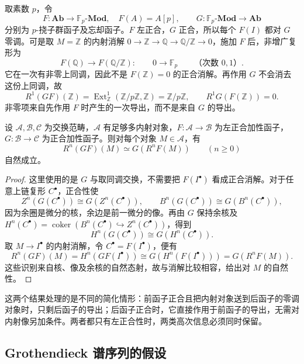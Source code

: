 \begin{example}\label{b4:exm:composite-first-not-exact}
	取素数 \(p\)，令
	\[
		F:\mathbf{Ab}\longrightarrow\mathbb F_p\text{-}\mathbf{Mod},\quad F(A)=A[p], \qquad G:\mathbb F_p\text{-}\mathbf{Mod}\longrightarrow\mathbf{Ab}
	\]
	分别为 \(p\)-挠子群函子及忘却函子。\(F\) 左正合，\(G\) 正合，所以每个 \(F(I)\) 都对 \(G\) 零调。可是取 \(M=\mathbb Z\) 的内射消解 \(0\to\mathbb Z\to\mathbb Q\to\mathbb Q/\mathbb Z\to0\)，施加 \(F\) 后，非增广复形为
	\[
		F(\mathbb Q)\longrightarrow F(\mathbb Q/\mathbb Z): \qquad 0\longrightarrow\mathbb F_p \qquad\text{（次数 }0,1\text{）}.
	\]
	它在一次有非零上同调，因此不是 \(F(\mathbb Z)=0\) 的正合消解。再作用 \(G\) 不会消去这份上同调，故
	\[
		R^1(GF)(\mathbb Z)=\operatorname{Ext}_{\mathbb Z}^1(\mathbb Z/p\mathbb Z,\mathbb Z) =\mathbb Z/p\mathbb Z,\qquad R^1G(F(\mathbb Z))=0.
	\]
	非零项来自先作用 \(F\) 时产生的一次导出，而不是来自 \(G\) 的导出。
\end{example}

\begin{proposition}\label{b4:prop:derived-composite-exact-second}
	设 \(\mathcal A,\mathcal B,\mathcal C\) 为交换范畴，\(\mathcal A\) 有足够多内射对象，\(F:\mathcal A\to\mathcal B\) 为左正合加性函子，\(G:\mathcal B\to\mathcal C\) 为正合加性函子。则对每个对象 \(M\in\mathcal A\)，有
	\[
		R^n(GF)(M)\simeq G(R^nF(M))\qquad(n\ge0)
	\]
	自然成立。
\end{proposition}
\begin{proof}
	这里使用的是 \(G\) 与取同调交换，不需要把 \(F(I^\bullet)\) 看成正合消解。对于任意上链复形 \(C^\bullet\)，正合性使
	\[
		Z^n(G(C^\bullet))\cong G(Z^n(C^\bullet)),\qquad B^n(G(C^\bullet))\cong G(B^n(C^\bullet)),
	\]
	因为余圈是微分的核，余边是前一微分的像。再由 \(G\) 保持余核及 \(H^n(C^\bullet)=\operatorname{coker}(B^n(C^\bullet)\hookrightarrow Z^n(C^\bullet))\)，得到
	\[
		H^n(G(C^\bullet))\cong G(H^n(C^\bullet)).
	\]
	取 \(M\to I^\bullet\) 的内射消解，令 \(C^\bullet=F(I^\bullet)\)，便有
	\[
		R^n(GF)(M)=H^n(GF(I^\bullet)) \cong G(H^n(F(I^\bullet)))=G(R^nF(M)).
	\]
	这些识别来自核、像及余核的自然态射，故与消解比较相容，给出对 \(M\) 的自然性。
\end{proof}

这两个结果处理的是不同的简化情形：前函子正合且把内射对象送到后函子的零调对象时，只剩后函子的导出；后函子正合时，它直接作用于前函子的导出，无需对内射像另加条件。两者都只有左正合性时，两类高次信息必须同时保留。

\subsection{Grothendieck 谱序列的假设}
\label{b4:subsec:1004:03}

